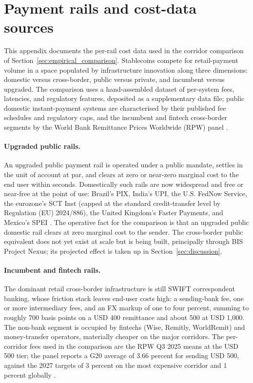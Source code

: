\section{Payment rails and cost-data sources}\label{app:cost_data}\label{sec:landscape}

This appendix documents the per-rail cost data used in the corridor comparison of Section~\ref{sec:empirical_comparison}. Stablecoins compete for retail-payment volume in a space populated by infrastructure innovation along three dimensions: domestic versus cross-border, public versus private, and incumbent versus upgraded. The comparison uses a hand-assembled dataset of per-system fees, latencies, and regulatory features, deposited as a supplementary data file; public domestic instant-payment systems are characterised by their published fee schedules and regulatory caps, and the incumbent and fintech cross-border segments by the World Bank Remittance Prices Worldwide (RPW) panel \citep{rpw_q3_2025,beck_martinez_peria_2011}.

\paragraph{Upgraded public rails.} An upgraded public payment rail is operated under a public mandate, settles in the unit of account at par, and clears at zero or near-zero marginal cost to the end user within seconds. Domestically such rails are now widespread and free or near-free at the point of use: Brazil's PIX, India's UPI, the U.S. FedNow Service, the eurozone's SCT Inst (capped at the standard credit-transfer level by Regulation (EU) 2024/886), the United Kingdom's Faster Payments, and Mexico's SPEI \citep{frost_etal_2024_fast_payments,duarte_etal_2022_pix}. The operative fact for the comparison is that an upgraded public domestic rail clears at zero marginal cost to the sender. The cross-border public equivalent does not yet exist at scale but is being built, principally through BIS Project Nexus; its projected effect is taken up in Section~\ref{sec:discussion}.

\paragraph{Incumbent and fintech rails.} The dominant retail cross-border infrastructure is still SWIFT correspondent banking, whose friction stack \citep{cpmi_2018_cross_border_retail} leaves end-user costs high: a sending-bank fee, one or more intermediary fees, and an FX markup of one to four percent, summing to roughly 700 basis points on a USD 400 remittance and about 500 at USD 1{,}000. The non-bank segment is occupied by fintechs (Wise, Remitly, WorldRemit) and money-transfer operators, materially cheaper on the major corridors. The per-corridor fees used in the comparison are the RPW Q3 2025 means at the USD 500 tier; the panel reports a G20 average of 3.66 percent for sending USD 500, against the 2027 targets of 3 percent on the most expensive corridor and 1 percent globally \citep{rpw_q3_2025}.

